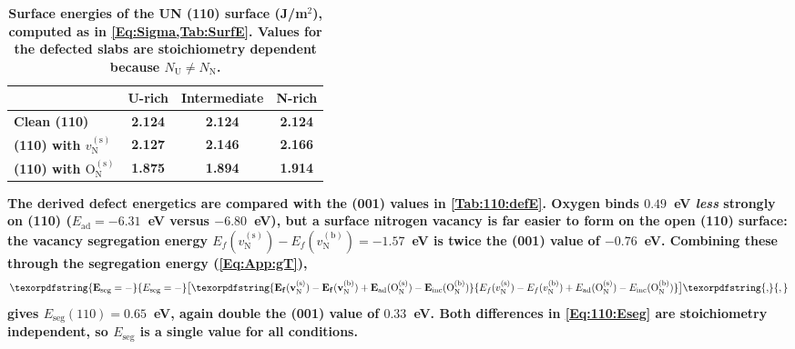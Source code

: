 \documentclass[preprint,12pt,sort&compress]{elsarticle}
\newcommand{\?}{\stackrel{?}{=}}
\providecommand{\DIFaddtex}[1]{{\bf #1}} %
\providecommand{\DIFaddFL}[1]{\DIFadd{#1}} %
\providecommand{\DIFadd}[1]{\texorpdfstring{\DIFaddtex{#1}}{#1}} %
\begin{document}
\begin{table}[h!]
\centering
\footnotesize
\caption{\DIFaddFL{Surface energies of the UN (110) surface (J/m$^2$), computed as in \cref{Eq:Sigma,Tab:SurfE}. Values for the defected slabs are stoichiometry dependent because $N_\text{U}\neq N_\text{N}$.}}
\begin{tabular}{lccc}
\hline
 & \DIFaddFL{U-rich }& \DIFaddFL{Intermediate }& \DIFaddFL{N-rich }\\
\hline
\DIFaddFL{Clean (110)                                 }& \DIFaddFL{2.124 }& \DIFaddFL{2.124 }& \DIFaddFL{2.124 }\\
\DIFaddFL{(110) with $v_\text{N}^{(\text{s})}$        }& \DIFaddFL{2.127 }& \DIFaddFL{2.146 }& \DIFaddFL{2.166 }\\
\DIFaddFL{(110) with $\text{O}_\text{N}^{(\text{s})}$ }& \DIFaddFL{1.875 }& \DIFaddFL{1.894 }& \DIFaddFL{1.914 }\\
\hline
\end{tabular}
\label{Tab:110:surfE}
\end{table}

\DIFadd{The derived defect energetics are compared with the (001) values in \cref{Tab:110:defE}. Oxygen binds $0.49$~eV \emph{less} strongly on (110) ($E_\text{ad}=-6.31$~eV versus $-6.80$~eV), but a surface nitrogen vacancy is far easier to form on the open (110) surface: the vacancy segregation energy $E_f(v_\text{N}^{(\text{s})})-E_f(v_\text{N}^{(\text{b})})=-1.57$~eV is twice the (001) value of $-0.76$~eV. Combining these through the segregation energy (\cref{Eq:App:gT}),
}\begin{equation}
\DIFadd{E_\text{seg}=-}\bigl[\DIFadd{E_f(v_\text{N}^{(\text{s})})-E_f(v_\text{N}^{(\text{b})}) + E_\text{ad}(\text{O}_\text{N}^{(\text{s})}) - E_\text{inc}(\text{O}_\text{N}^{(\text{b})})}\bigr]\DIFadd{,
}\label{Eq:110:Eseg}
\end{equation}
\DIFadd{gives $E_\text{seg}(110)=0.65$~eV, again double the (001) value of $0.33$~eV. Both differences in \cref{Eq:110:Eseg} are stoichiometry independent, so $E_\text{seg}$ is a single value for all conditions.
}
\end{document}
